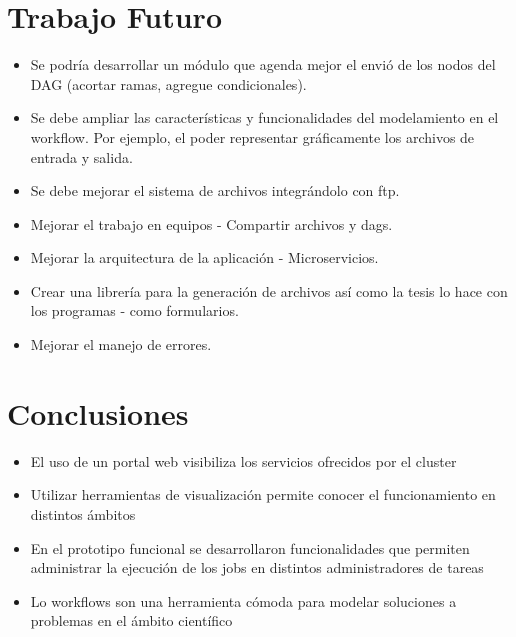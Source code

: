 
\section{Trabajo Futuro}

\begin{itemize}
\item Se podría desarrollar un módulo que agenda mejor el envió de los nodos del DAG (acortar ramas, agregue condicionales).
\item Se debe ampliar las características y funcionalidades del modelamiento en el workflow. Por ejemplo, el poder representar gráficamente los archivos de entrada y salida.
\item Se debe mejorar el sistema de archivos integrándolo con ftp.
\item Mejorar el trabajo en equipos - Compartir archivos y dags.
\item Mejorar la arquitectura de la aplicación - Microservicios.
\item Crear una librería para la generación de archivos así como la tesis lo hace con los programas - como formularios.
\item Mejorar el manejo de errores.
\end{itemize}

\section{Conclusiones}

\begin{itemize}
\item El uso de un portal web visibiliza los servicios ofrecidos por el cluster
\item Utilizar herramientas de visualización permite conocer el funcionamiento en distintos ámbitos
\item En el prototipo funcional se desarrollaron funcionalidades que permiten administrar la ejecución de los jobs en distintos administradores de tareas
\item Lo workflows son una herramienta cómoda para modelar soluciones a problemas en el ámbito científico
\end{itemize}